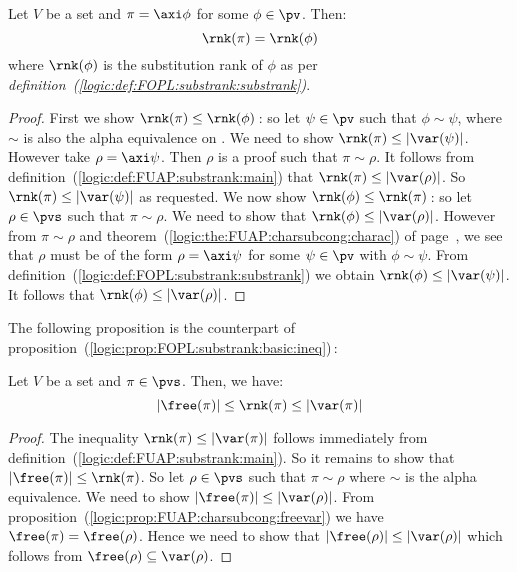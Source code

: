 \begin{prop}\label{logic:prop:FUAP:substrank:recursion:axiom}
Let $V$ be a set and $\pi=\axi\phi$ for some $\phi\in\pv$. Then:
    \[
    \rnk(\pi)=\rnk(\phi)
    \]
where $\rnk(\phi)$ is the substitution rank of $\phi$ as per {\em
definition~(\ref{logic:def:FOPL:substrank:substrank})}.
\end{prop}
\begin{proof}
First we show $\rnk(\pi)\leq\rnk(\phi)$\,: so let $\psi\in\pv$ such
that $\phi\sim\psi$, where $\sim$ is also the alpha equivalence on \pv. 
We need to show $\rnk(\pi)\leq|\var(\psi)|$.
However take $\rho=\axi\psi$. Then $\rho$ is a proof such that
$\pi\sim\rho$. It follows from
definition~(\ref{logic:def:FUAP:substrank:main}) that
$\rnk(\pi)\leq|\var(\rho)|$. So $\rnk(\pi)\leq|\var(\psi)|$ as
requested. We now show $\rnk(\phi)\leq\rnk(\pi)$\,: so let
$\rho\in\pvs$ such that $\pi\sim\rho$. We need to show that
$\rnk(\phi)\leq|\var(\rho)|$. However from $\pi\sim\rho$ and
theorem~(\ref{logic:the:FUAP:charsubcong:charac}) of
page~\pageref{logic:the:FUAP:charsubcong:charac}, we see that $\rho$
must be of the form $\rho=\axi\psi$ for some $\psi\in\pv$ with
$\phi\sim\psi$. From
definition~(\ref{logic:def:FOPL:substrank:substrank}) we obtain
$\rnk(\phi)\leq|\var(\psi)|$. It follows that
$\rnk(\phi)\leq|\var(\rho)|$.
\end{proof}

The following proposition is the counterpart of
proposition~(\ref{logic:prop:FOPL:substrank:basic:ineq})\,:

\begin{prop}\label{logic:prop:FUAP:substrank:basic:ineq}
Let $V$ be a set and $\pi\in\pvs$. Then, we have:
    \[
    |\free(\pi)|\leq\rnk(\pi)\leq|\var(\pi)|
    \]
\end{prop}
\begin{proof}
The inequality $\rnk(\pi)\leq|\var(\pi)|$ follows immediately from
definition~(\ref{logic:def:FUAP:substrank:main}). So it remains to
show that $|\free(\pi)|\leq\rnk(\pi)$. So let $\rho\in\pvs$ such
that $\pi\sim\rho$ where $\sim$ is the alpha equivalence. We
need to show $|\free(\pi)|\leq|\var(\rho)|$. From
proposition~(\ref{logic:prop:FUAP:charsubcong:freevar}) we have
$\free(\pi)=\free(\rho)$. Hence we need to show that
$|\free(\rho)|\leq|\var(\rho)|$ which follows from
$\free(\rho)\subseteq\var(\rho)$.
\end{proof}

